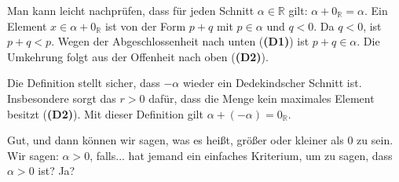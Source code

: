 \begin{math-stroke}

\begin{explanation-of-steps}
Man kann leicht nachprüfen, dass für jeden Schnitt $\alpha \in \mathbb{R}$ gilt: $\alpha + 0_{\mathbb{R}} = \alpha$. Ein Element $x \in \alpha + 0_{\mathbb{R}}$ ist von der Form $p + q$ mit $p \in \alpha$ und $q < 0$. Da $q < 0$, ist $p + q < p$. Wegen der Abgeschlossenheit nach unten (\textbf{(D1)}) ist $p + q \in \alpha$. Die Umkehrung folgt aus der Offenheit nach oben (\textbf{(D2)}).
\end{explanation-of-steps}
\end{math-stroke}

\begin{math-stroke}

\begin{explanation-of-steps}
Die Definition stellt sicher, dass $-\alpha$ wieder ein Dedekindscher Schnitt ist. Insbesondere sorgt das $r > 0$ dafür, dass die Menge kein maximales Element besitzt (\textbf{(D2)}). Mit dieser Definition gilt $\alpha + (-\alpha) = 0_{\mathbb{R}}$.
\end{explanation-of-steps}
\end{math-stroke}

\begin{spoken-clean}[01:04:45 - 01:05:30]
Gut, und dann können wir sagen, was es heißt, größer oder kleiner als $0$ zu sein. Wir sagen: $\alpha > 0$, falls... hat jemand ein einfaches Kriterium, um zu sagen, dass $\alpha > 0$ ist? Ja?
\end{spoken-clean}

